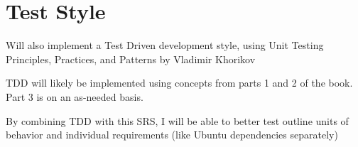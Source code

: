 \section{Test Style}

Will also implement a Test Driven development style, using Unit Testing Principles, Practices, and Patterns by Vladimir Khorikov

TDD will likely be implemented using concepts from parts 1 and 2 of the book. Part 3 is on an as-needed basis.

By combining TDD with this SRS, I will be able to better test outline units of behavior and individual requirements (like Ubuntu dependencies separately)


